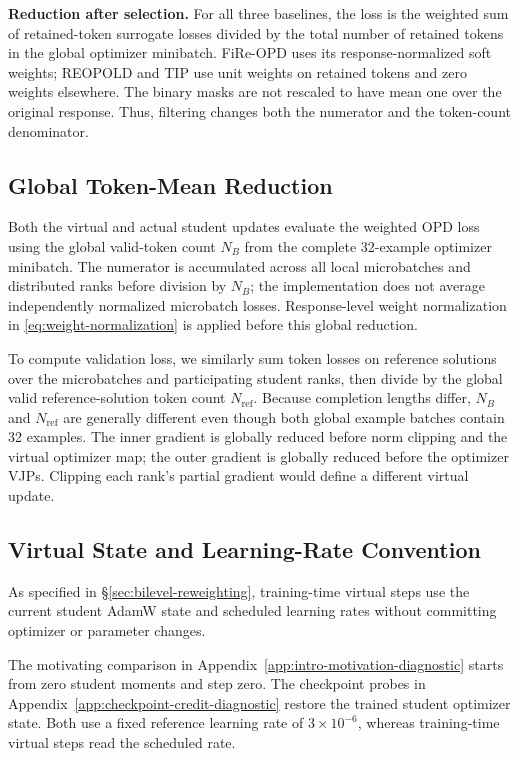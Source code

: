 \documentclass{article}
\theoremstyle{plain}
\theoremstyle{definition}
\theoremstyle{remark}
\begin{document}
\textbf{Reduction after selection.}
For all three baselines, the loss is the weighted sum of retained-token surrogate losses divided by the total number of retained tokens in the global optimizer minibatch. FiRe-OPD uses its response-normalized soft weights; REOPOLD and TIP use unit weights on retained tokens and zero weights elsewhere. The binary masks are not rescaled to have mean one over the original response. Thus, filtering changes both the numerator and the token-count denominator.



\subsection{Global Token-Mean Reduction}

Both the virtual and actual student updates evaluate the weighted OPD loss using the global valid-token count \(N_B\) from the complete 32-example optimizer minibatch. The numerator is accumulated across all local microbatches and distributed ranks before division by \(N_B\); the implementation does not average independently normalized microbatch losses. Response-level weight normalization in \cref{eq:weight-normalization} is applied before this global reduction.


To compute validation loss, we similarly sum token losses on reference solutions over the microbatches and participating student ranks, then divide by the global valid reference-solution token count \(N_{\mathrm{ref}}\). Because completion lengths differ, \(N_B\) and \(N_{\mathrm{ref}}\) are generally different even though both global example batches contain 32 examples.
The inner gradient is globally reduced before norm clipping and the virtual optimizer map; the outer gradient is globally reduced before the optimizer VJPs. Clipping each rank's partial gradient would define a different virtual update.

\subsection{Virtual State and Learning-Rate Convention}

As specified in \S\ref{sec:bilevel-reweighting}, training-time virtual steps use the current student AdamW state and scheduled learning rates without committing optimizer or parameter changes.

The motivating comparison in Appendix~\ref{app:intro-motivation-diagnostic} starts from zero student moments and step zero. The checkpoint probes in Appendix~\ref{app:checkpoint-credit-diagnostic} restore the trained student optimizer state. Both use a fixed reference learning rate of \(3\times10^{-6}\), whereas training-time virtual steps read the scheduled rate.
\end{document}

